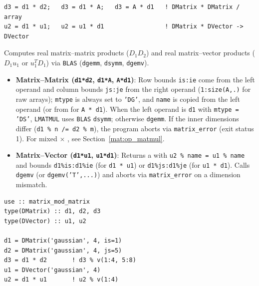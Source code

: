 \lstset{language=[95]Fortran}
\begin{lstlisting}
d3 = d1 * d2;   d3 = d1 * A;   d3 = A * d1   ! DMatrix * DMatrix / array
u2 = d1 * u1;   u2 = u1 * d1                 ! DMatrix * DVector -> DVector
\end{lstlisting}

Computes real matrix--matrix products ($D_1 D_2$) and real matrix--vector products ($D_1 u_1$ or $u_1^T D_1$) via \texttt{BLAS} (\texttt{dgemm}, \texttt{dsymm}, \texttt{dgemv}).

\begin{itemize}
  \item \textbf{Matrix--Matrix (\texttt{d1*d2}, \texttt{d1*A}, \texttt{A*d1})}: Row bounds \texttt{is:ie} come from the left operand and column bounds \texttt{js:je} from the right operand (\texttt{1:size(A,.)} for raw arrays); \texttt{mtype} is always set to \texttt{'DG'}, and \texttt{name} is copied from the left operand (or from  for \texttt{A * d1}). When the left operand is \texttt{d1} with \texttt{mtype = 'DS'}, \texttt{LMATMUL} uses \texttt{BLAS} \texttt{dsymm}; otherwise \texttt{dgemm}. If the inner dimensions differ (\texttt{d1 \% n /= d2 \% m}), the program aborts via \texttt{matrix\_error} (exit status 1). For mixed  $\times$ , see Section~\ref{mat:op_matmul}.
  \item \textbf{Matrix--Vector (\texttt{d1*u1}, \texttt{u1*d1})}: Returns a  with \texttt{u2 \% name = u1 \% name} and bounds \texttt{d1\%is:d1\%ie} (for \texttt{d1 * u1}) or \texttt{d1\%js:d1\%je} (for \texttt{u1 * d1}). Calls \texttt{dgemv} (or \texttt{dgemv('T',...)}) and aborts via \texttt{matrix\_error} on a dimension mismatch.
\end{itemize}

\begin{description}[leftmargin=2.2cm, style=nextline]
\end{description}

\lstset{language=[95]Fortran}
\begin{lstlisting}
use :: matrix_mod_matrix
type(DMatrix) :: d1, d2, d3
type(DVector) :: u1, u2

d1 = DMatrix('gaussian', 4, is=1)
d2 = DMatrix('gaussian', 4, js=5)
d3 = d1 * d2       ! d3 % v(1:4, 5:8)
u1 = DVector('gaussian', 4)
u2 = d1 * u1       ! u2 % v(1:4)
\end{lstlisting}

